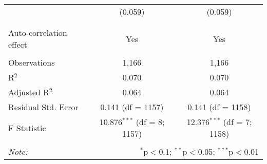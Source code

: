 \begin{table}[!htbp]
\begin{tabular}{@{\extracolsep{5pt}}lcc}
  & (0.059) & (0.059) \\ 
  & & \\ 
\hline \\[-1.8ex] 
Auto-correlation effect & Yes & Yes \\ 
\hline \\[-1.8ex] 
Observations & 1,166 & 1,166 \\ 
R$^{2}$ & 0.070 & 0.070 \\ 
Adjusted R$^{2}$ & 0.064 & 0.064 \\ 
Residual Std. Error & 0.141 (df = 1157) & 0.141 (df = 1158) \\ 
F Statistic & 10.876$^{***}$ (df = 8; 1157) & 12.376$^{***}$ (df = 7; 1158) \\ 
\hline 
\hline \\[-1.8ex] 
\textit{Note:}  & \multicolumn{2}{r}{$^{*}$p$<$0.1; $^{**}$p$<$0.05; $^{***}$p$<$0.01} \\ 
\end{tabular} 
\end{table} 
